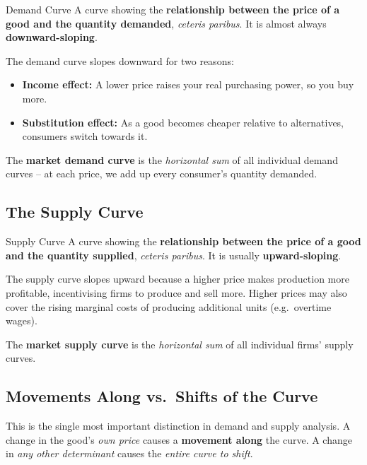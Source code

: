 \documentclass[11pt, a4paper, twoside]{book}
\begin{document}
\begin{keyterm}{Demand Curve}
A curve showing the \textbf{relationship between the price of a good and the quantity demanded}, \emph{ceteris paribus}. It is almost always \textbf{downward-sloping}.
\end{keyterm}

The demand curve slopes downward for two reasons:
\begin{itemize}
  \item \textbf{Income effect:} A lower price raises your real purchasing power, so you buy more.
  \item \textbf{Substitution effect:} As a good becomes cheaper relative to alternatives, consumers switch towards it.
\end{itemize}

The \textbf{market demand curve} is the \emph{horizontal sum} of all individual demand curves -- at each price, we add up every consumer's quantity demanded.

\subsection{The Supply Curve}

\begin{keyterm}{Supply Curve}
A curve showing the \textbf{relationship between the price of a good and the quantity supplied}, \emph{ceteris paribus}. It is usually \textbf{upward-sloping}.
\end{keyterm}

The supply curve slopes upward because a higher price makes production more profitable, incentivising firms to produce and sell more. Higher prices may also cover the rising marginal costs of producing additional units (e.g.\ overtime wages).

The \textbf{market supply curve} is the \emph{horizontal sum} of all individual firms' supply curves.

\subsection{Movements Along vs.\ Shifts of the Curve}

\begin{coreidea}
This is the single most important distinction in demand and supply analysis. A change in the good's \emph{own price} causes a \textbf{movement along} the curve. A change in \emph{any other determinant} causes the \emph{entire curve to shift}.
\end{coreidea}
\end{document}
